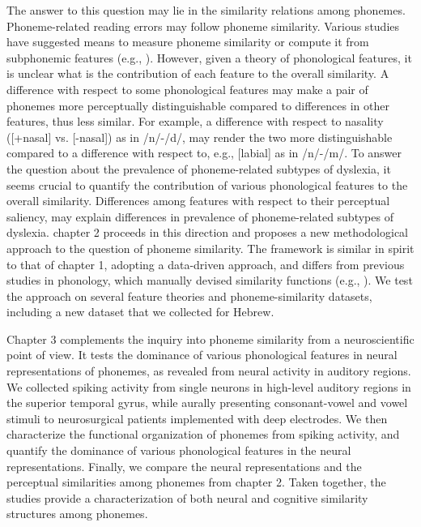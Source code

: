The answer to this question may lie in the similarity relations among phonemes. Phoneme-related reading errors may follow phoneme similarity. Various studies have suggested means to measure phoneme similarity \citep{NicelyMiller1955} or compute it from subphonemic features (e.g., \citealp{Pierrehumbert1993}). However, given a theory of phonological features, it is unclear what is the contribution of each feature to the overall similarity. A difference with respect to some phonological features may make a pair of phonemes more perceptually distinguishable compared to differences in other features, thus less similar. For example, a difference with respect to nasality ([+nasal] vs. [-nasal]) as in /n/-/d/, may render the two more distinguishable compared to a difference with respect to, e.g., [labial] as in /n/-/m/. To answer the question about the prevalence of phoneme-related subtypes of dyslexia, it seems crucial to quantify the contribution of various phonological features to the overall similarity. Differences among features with respect to their perceptual saliency, may explain differences in prevalence of phoneme-related subtypes of dyslexia. chapter 2 proceeds in this direction and proposes a new methodological approach to the question of phoneme similarity. The framework is similar in spirit to that of chapter 1, adopting a data-driven approach, and differs from previous studies in phonology, which manually devised similarity functions (e.g., \citealp{Frisch1997}). We test the approach on several feature theories and phoneme-similarity datasets, including a new dataset that we collected for Hebrew.  

Chapter 3 complements the inquiry into phoneme similarity from a neuroscientific point of view. It tests the dominance of various phonological features in neural representations of phonemes, as revealed from neural activity in auditory regions. We collected spiking activity from single neurons in high-level auditory regions in the superior temporal gyrus, while aurally presenting consonant-vowel and vowel stimuli to neurosurgical patients implemented with deep electrodes. We then characterize the functional organization of phonemes from spiking activity, and quantify the dominance of various phonological features in the neural representations. Finally, we compare the neural representations and the perceptual similarities among phonemes from chapter 2. Taken together, the studies provide a characterization of both neural and cognitive similarity structures among phonemes.